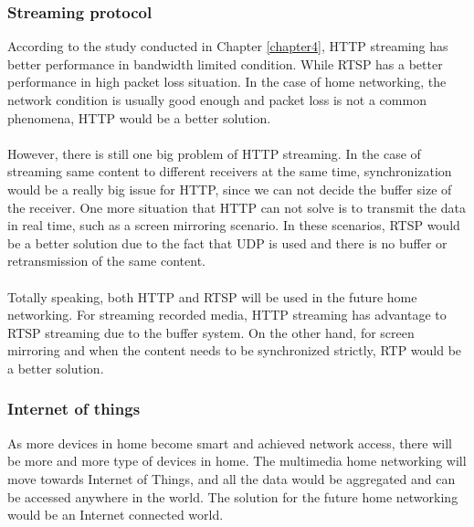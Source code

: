 \subsubsection{Streaming protocol}
According to the study conducted in Chapter \ref{chapter4}, HTTP streaming has better performance in bandwidth limited condition. While RTSP has a better performance in high packet loss situation. In the case of home networking, the network condition is usually good enough and packet loss is not a common phenomena, HTTP would be a better solution. \\
\\
However, there is still one big problem of HTTP streaming. In the case of streaming same content to different receivers at the same time, synchronization would be a really big issue for HTTP, since we can not decide the buffer size of the receiver. One more situation that HTTP can not solve is to transmit the data in real time, such as a screen mirroring scenario. In these scenarios, RTSP would be a better solution due to the fact that UDP is used and there is no buffer or retransmission of the same content.\\
\\
Totally speaking, both HTTP and RTSP will be used in the future home networking. For streaming recorded media, HTTP streaming has advantage to RTSP streaming due to the buffer system. On the other hand, for screen mirroring and when the content needs to be synchronized strictly, RTP would be a better solution.
\subsubsection{Internet of things}
As more devices in home become smart and achieved network access, there will be more and more type of devices in home. The multimedia home networking will move towards Internet of Things, and all the data would be aggregated and can be accessed anywhere in the world. The solution for the future home networking would be an Internet connected world.